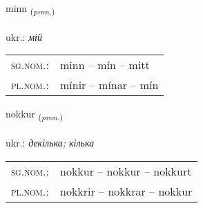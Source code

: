 \documentclass[frontgrid, backgrid]{flacards}\usepackage[]{graphicx}\usepackage[]{xcolor}
\begin{document}
\renewcommand{\blhead}{\vskip5pt {\small\bfseries\footnotesize Fornafn | займенник }}
\renewcommand{\bcfoot}{\vskip5pt \hspace{2pt}{\small\bfseries\footnotesize 1K}}


{minn \small{\textsubscript{(\textit{pron.})}} \\[1ex] %
\textphonetic{[mɪn]} \\
ukr.: \emph{мій} \\  [2ex]
\renewcommand*{\arraystretch}{0.8}
\begin{tabular}{ll}
\textsc{sg.nom.}: & minn  --  mín -- mitt \\ 
\textsc{pl.nom.}: & mínir -- mínar -- mín
\end{tabular}
}

\renewcommand{\flhead}{\vskip5pt \fboxsep=0pt {\small\bfseries\footnotesize Fornafn | займенник}}
\renewcommand{\fcfoot}{\vskip5pt \fboxsep=0pt \hspace{2pt}{\small\bfseries\footnotesize 1K}}

\renewcommand{\blhead}{\vskip5pt {\small\bfseries\footnotesize Fornafn | займенник }}
\renewcommand{\bcfoot}{\vskip5pt \hspace{2pt}{\small\bfseries\footnotesize 1K}}


{nokkur \small{\textsubscript{(\textit{pron.})}} \\[1ex] %
\textphonetic{[nɔhkʏr]} \\
ukr.: \emph{декілька; кілька} \\  [2ex]
\renewcommand*{\arraystretch}{0.8}
\begin{tabular}{ll}
\textsc{sg.nom.}: & nokkur  --  nokkur -- nokkurt \\ 
\textsc{pl.nom.}: & nokkrir -- nokkrar -- nokkur
\end{tabular}
}

\renewcommand{\flhead}{\vskip5pt \fboxsep=0pt {\small\bfseries\footnotesize Sagnorð | дієслово}}
\renewcommand{\fcfoot}{\vskip5pt \fboxsep=0pt \hspace{2pt}{\small\bfseries\footnotesize 1K}}
\end{document}
